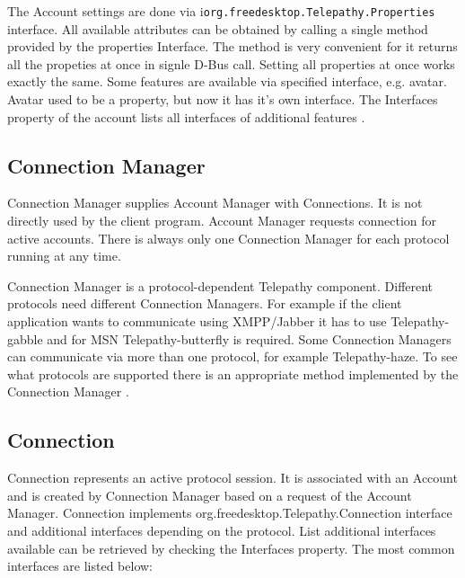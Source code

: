 The Account settings are done via i\verb|org.freedesktop.Telepathy.Properties| interface. All available attributes can be obtained by calling a single method provided by the properties Interface. The method is very convenient for it returns all the propeties at once in signle D-Bus call. Setting all properties at once works exactly the same. Some features are available via specified interface, e.g. avatar. Avatar used to be a property, but now it has it's own interface. The Interfaces property of the account lists all interfaces of additional features \cite{TPWiki}.

\subsection*{Connection Manager}
Connection Manager supplies Account Manager with Connections. It is not directly used by the client program. Account Manager requests connection for active accounts. There is always only one Connection Manager for each protocol running at any time.

Connection Manager is a protocol-dependent Telepathy component. Different protocols need different Connection Managers. For example if the client application wants to communicate using XMPP/Jabber it has to use Telepathy-gabble and for MSN Telepathy-butterfly is required. Some Connection Managers can communicate via more than one protocol, for example Telepathy-haze. To see what protocols are supported there is an appropriate method implemented by the Connection Manager \cite{TPWiki}.

\subsection*{Connection}
Connection represents an active protocol session. It is associated with an Account and is created by Connection Manager based on a request of the Account Manager. Connection implements org.freedesktop.Telepathy.Connection interface and additional interfaces depending on the protocol. List additional interfaces available can be retrieved by checking the Interfaces property. The most common interfaces are listed below\cite{TPWiki}:

